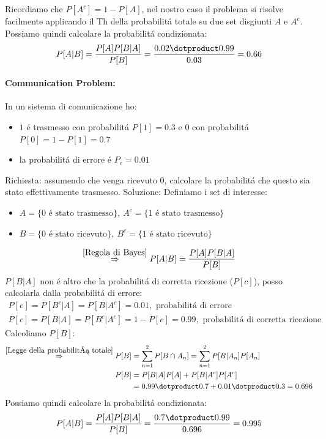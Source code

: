                 Ricordiamo che $P[A^c] = 1-P[A]$, nel nostro caso il problema si risolve facilmente applicando il Th della probabilitá totale su due set disgiunti 
                $A$ e $A^c$. Possiamo quindi calcolare la probabilitá condizionata:
                \[
                    P[A|B] = \frac{P[A]P[B|A]}{P[B]} = \frac{0.02 \dotproduct 0.99}{0.03} = 0.66    
                \]

            \paragraph{Communication Problem:} In un sistema di comunicazione ho:
                \begin{itemize}
                    \item {$1$ é trasmesso con probabilitá $P[1] = 0.3$ e $0$ con probabilitá $P[0] = 1-P[1] = 0.7$}
                    \item {la probabilitá di errore é $P_e = 0.01$}
                \end{itemize}
                Richiesta: assumendo che venga ricevuto $0$, calcolare la probabilitá che questo sia stato effettivamente trasmesso.
                Soluzione: Definiamo i set di interesse:
                \begin{itemize}
                    \item {$A = \{0\text{ é stato trasmesso}\},\ A^c = \{1 \text{ é stato trasmesso}\}$}
                    \item {$B = \{0\text{ é stato ricevuto}\},\ B^c = \{1 \text{ é stato ricevuto}\}$}
                \end{itemize}
                \[
                    \overset{\ref{Regola di Bayes}}{\Rightarrow} P[A|B] = \frac{P[A]P[B|A]}{P[B]}    
                \]                           
                $P[B|A]$ non é altro che la probabilitá di corretta ricezione ($P[c]$), posso calcolarla dalla probabilitá di errore:
                \begin{gather}
                    P[e] = P[B^c|A] = P[B|A^c] = 0.01, \text{ probabilitá di errore} \nonumber \\
                    P[c] = P[B|A] = P[B^c|A^c] = 1-P[e]= 0.99, \text{ probabilitá di corretta ricezione}\nonumber 
                \end{gather}
                Calcoliamo $P[B]$:
                \begin{align}
                    \overset{\ref{Legge della probabilitá totale}}{\Rightarrow} P[B] &= \sum_{n=1}^{2} P[B\cap A_n] = \sum_{n=1}^{2} P[B|A_n] P[A_n] \nonumber \\
                    P[B] &= P[B|A]P[A] + P[B|A^c]P[A^c] \nonumber \\
                         &= 0.99\dotproduct 0.7 + 0.01 \dotproduct 0.3 = 0.696 \nonumber       
                \end{align}
                Possiamo quindi calcolare la probabilitá condizionata:
                \[
                    P[A|B] = \frac{P[A]P[B|A]}{P[B]} = \frac{0.7 \dotproduct 0.99}{0.696} = 0.995    
                \]
